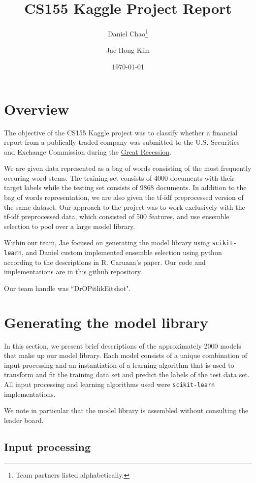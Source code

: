 \documentclass{article}
\title{CS155 Kaggle Project Report}
\author{Daniel Chao\thanks{Team partners listed alphabetically.} \and Jae Hong Kim\footnotemark[1]}
\date{\today}
\renewcommand{\(}{\left(}
\renewcommand{\)}{\right)}
\begin{document}
\maketitle 
\tableofcontents 

\section{Overview}
The objective of the CS155 Kaggle project was to classify whether a financial report from a publically traded company was submitted to the U.S. Securities and Exchange Commission during the \href{http://en.wikipedia.org/wiki/Great_Recession}{Great Recession}.  

We are given data represented as a bag of words consisting of the most frequently occuring word stems. The training set consists of 4000 documents with their target labels while the testing set consists of 9868 documents. In addition to the bag of words representation, we are also given the tf-idf preprocessed version of the same dataset. Our approach to the project was to work exclusively with the tf-idf preprocessed data, which consisted of 500 features, and use ensemble selection \cite{caruana04} to pool over a large model library.  

Within our team, Jae focused on generating the model library using \texttt{scikit-learn}, and Daniel custom implemented ensemble selection using python according to the descriptions in R. Caruana's paper. Our code and implementations are in \href{https://github.com/jkim-/KaggleCS155}{this} github repository. 

Our team handle was ``DrOPitlikEitshot". 

\section{Generating the model library} \label{sec:models}
In this section, we present brief descriptions of the approximately 2000 models that make up our model library.  Each model consists of a unique combination of input processing and an instantiation of a learning algorithm that is used to transform and fit the training data set and predict the labels of the test data set.  All input processing and learning algorithms used were \texttt{scikit-learn} implementations.  

We note in particular that the model library is assembled without consulting the leader board. 

  \subsection{Input processing}
\end{document}
